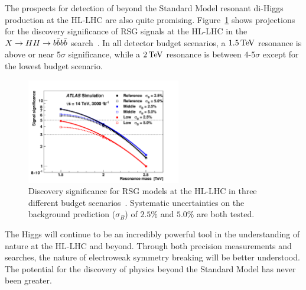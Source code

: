 The prospects for detection of beyond the Standard Model resonant di-Higgs production at the HL-LHC are also quite promising. Figure~\ref{fig:HH_prospect} shows projections for the discovery significance of RSG signals at the HL-LHC in the $X\to HH \to b\bar{b}b\bar{b}$ search~\cite{ScopingDocument}. In all detector budget scenarios, a $1.5 \TeV$ resonance is above or near $5\sigma$ significance, while a $2 \TeV$ resonance is between $4$-$5\sigma$ except for the lowest budget scenario. 
%
\begin{figure}[h!]
  \centering
  \captionsetup{justification=centering}

  \includegraphics[width=0.6\textwidth]{figures/HH_scoping}
        
   \caption{Discovery significance for RSG models at the HL-LHC in three different budget scenarios~\cite{ScopingDocument}. Systematic uncertainties on the background prediction ($\sigma_B$) of $2.5\%$ and $5.0\%$ are both tested.}
  \label{fig:HH_prospect}
\end{figure}
%

The Higgs will continue to be an incredibly powerful tool in the understanding of nature at the HL-LHC and beyond. Through both precision measurements and searches, the nature of electroweak symmetry breaking will be better understood. The potential for the discovery of physics beyond the Standard Model has never been greater. 



